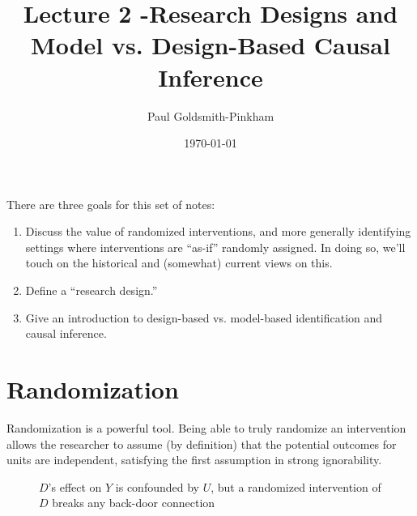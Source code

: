 \documentclass{tufte-handout}
\title{Lecture 2 -Research Designs and Model vs. Design-Based Causal Inference}
\author{Paul Goldsmith-Pinkham}
\date{\today}
\theoremstyle{break}
\begin{document}
\maketitle
There are three goals for this set of notes:
\begin{enumerate}
  \item Discuss the value of randomized interventions, and more generally identifying settings where interventions are ``as-if'' randomly assigned. In doing so, we'll touch on the historical and (somewhat) current views on this.
  \item Define a ``research design.''
  \item Give an introduction to design-based vs. model-based identification and causal inference.
\end{enumerate}

\section{Randomization}
Randomization is a powerful tool. Being able to truly randomize an intervention allows the researcher to assume (by definition) that the potential outcomes for units are independent, satisfying the first assumption in strong ignorability.


\begin{figure}
  \begin{center}
  \end{center}
  \caption{$D$'s effect on $Y$ is confounded by $U$, but a randomized intervention of $D$ breaks any back-door connection}
\end{figure}
\end{document}
